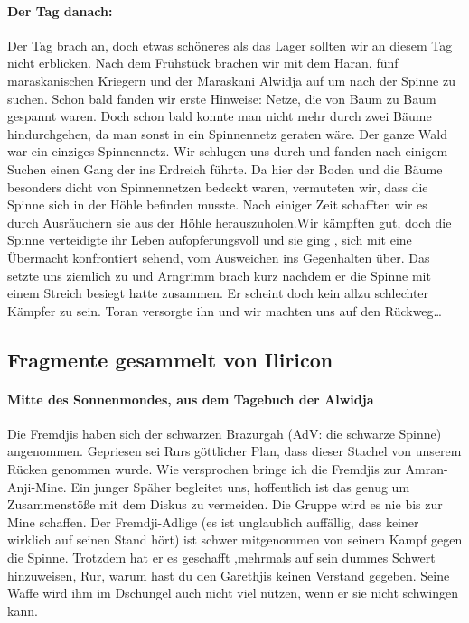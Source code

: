 \paragraph{Der Tag danach:}
Der Tag brach an, doch etwas schöneres als das Lager sollten wir an diesem Tag nicht erblicken. Nach dem Frühstück brachen wir mit dem Haran, fünf maraskanischen Kriegern und der Maraskani Alwidja auf um nach der Spinne zu suchen. Schon bald fanden wir erste Hinweise: Netze, die von Baum zu Baum gespannt waren. Doch schon bald konnte man nicht mehr durch zwei Bäume hindurchgehen, da man sonst in ein Spinnennetz geraten wäre. Der ganze Wald war ein einziges Spinnennetz. Wir schlugen uns durch und fanden nach einigem Suchen einen Gang der ins Erdreich führte. Da hier der Boden und die Bäume besonders dicht von Spinnennetzen bedeckt waren, vermuteten wir, dass die Spinne sich in der Höhle befinden musste. Nach einiger Zeit schafften wir es durch Ausräuchern sie aus der Höhle herauszuholen.Wir kämpften gut, doch die Spinne verteidigte ihr Leben aufopferungsvoll und sie ging , sich mit eine Übermacht konfrontiert sehend, vom Ausweichen ins Gegenhalten über. Das setzte uns ziemlich zu und Arngrimm brach kurz nachdem er die Spinne mit einem Streich besiegt hatte zusammen. Er scheint doch kein allzu schlechter Kämpfer zu sein. Toran versorgte ihn und wir machten uns auf den Rückweg\dots

\subsection{Fragmente gesammelt von Iliricon}

\paragraph{Mitte des Sonnenmondes, aus dem Tagebuch der Alwidja}
Die Fremdjis haben sich der schwarzen Brazurgah (AdV: die schwarze Spinne) angenommen. Gepriesen sei Rurs göttlicher Plan, dass dieser Stachel von unserem Rücken genommen wurde. Wie versprochen bringe ich die Fremdjis zur Amran-Anji-Mine. Ein junger Späher begleitet uns, hoffentlich ist das genug um Zusammenstöße mit dem Diskus zu vermeiden. Die Gruppe wird es nie bis zur Mine schaffen. Der Fremdji-Adlige (es ist unglaublich auffällig, dass keiner wirklich auf seinen Stand hört) ist schwer mitgenommen von seinem Kampf gegen die Spinne. Trotzdem hat er es geschafft ,mehrmals auf sein dummes Schwert hinzuweisen, Rur, warum hast du den Garethjis keinen Verstand gegeben. Seine Waffe wird ihm im Dschungel auch nicht viel nützen, wenn er sie nicht schwingen kann.


